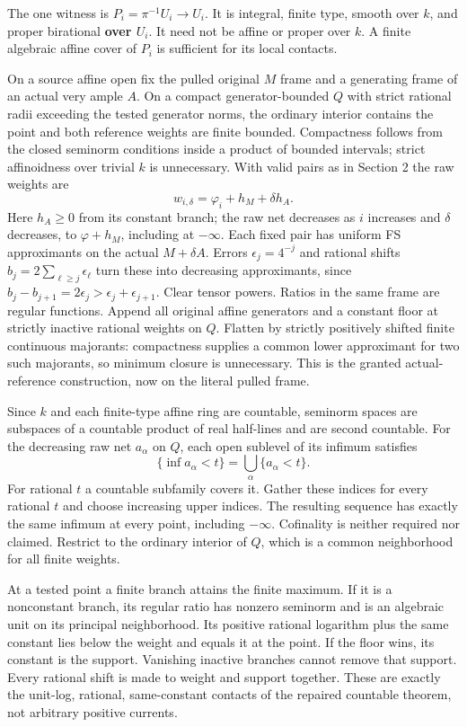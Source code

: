 \documentclass[
  10pt,
]{article}
\begin{document}
The one witness is \(P_i=\pi^{-1}U_i\to U_i\). It is integral, finite
type, smooth over \(k\), and proper birational \textbf{over \(U_i\)}. It
need not be affine or proper over \(k\). A finite algebraic affine cover
of \(P_i\) is sufficient for its local contacts.

On a source affine open fix the pulled original \(M\) frame and a
generating frame of an actual very ample \(A\). On a compact
generator-bounded \(Q\) with strict rational radii exceeding the tested
generator norms, the ordinary interior contains the point and both
reference weights are finite bounded. Compactness follows from the
closed seminorm conditions inside a product of bounded intervals; strict
affinoidness over trivial \(k\) is unnecessary. With valid pairs as in
Section 2 the raw weights are \[w_{i,\delta}=\varphi_i+h_M+\delta h_A.\]
Here \(h_A\ge0\) from its constant branch; the raw net decreases as
\(i\) increases and \(\delta\) decreases, to \(\varphi+h_M\), including
at \(-\infty\). Each fixed pair has uniform FS approximants on the
actual \(M+\delta A\). Errors \(\epsilon_j=4^{-j}\) and rational shifts
\(b_j=2\sum_{\ell\ge j}\epsilon_\ell\) turn these into decreasing
approximants, since
\(b_j-b_{j+1}=2\epsilon_j>\epsilon_j+\epsilon_{j+1}\). Clear tensor
powers. Ratios in the same frame are regular functions. Append all
original affine generators and a constant floor at strictly inactive
rational weights on \(Q\). Flatten by strictly positively shifted finite
continuous majorants: compactness supplies a common lower approximant
for two such majorants, so minimum closure is unnecessary. This is the
granted actual-reference construction, now on the literal pulled frame.

Since \(k\) and each finite-type affine ring are countable, seminorm
spaces are subspaces of a countable product of real half-lines and are
second countable. For the decreasing raw net \(a_\alpha\) on \(Q\), each
open sublevel of its infimum satisfies
\[\{\inf a_\alpha<t\}=\bigcup_\alpha\{a_\alpha<t\}.\] For rational \(t\)
a countable subfamily covers it. Gather these indices for every rational
\(t\) and choose increasing upper indices. The resulting sequence has
exactly the same infimum at every point, including \(-\infty\).
Cofinality is neither required nor claimed. Restrict to the ordinary
interior of \(Q\), which is a common neighborhood for all finite
weights.

At a tested point a finite branch attains the finite maximum. If it is a
nonconstant branch, its regular ratio has nonzero seminorm and is an
algebraic unit on its principal neighborhood. Its positive rational
logarithm plus the same constant lies below the weight and equals it at
the point. If the floor wins, its constant is the support. Vanishing
inactive branches cannot remove that support. Every rational shift is
made to weight and support together. These are exactly the unit-log,
rational, same-constant contacts of the repaired countable theorem, not
arbitrary positive currents.
\end{document}
